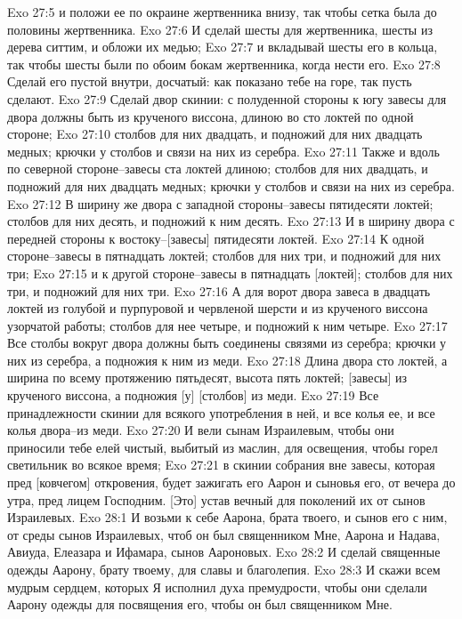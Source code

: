 Exo 27:5  и положи ее по окраине жертвенника внизу, так чтобы сетка была до половины жертвенника.
Exo 27:6  И сделай шесты для жертвенника, шесты из дерева ситтим, и обложи их медью;
Exo 27:7  и вкладывай шесты его в кольца, так чтобы шесты были по обоим бокам жертвенника, когда нести его.
Exo 27:8  Сделай его пустой внутри, досчатый: как показано тебе на горе, так пусть сделают.
Exo 27:9  Сделай двор скинии: с полуденной стороны к югу завесы для двора должны быть из крученого виссона, длиною во сто локтей по одной стороне;
Exo 27:10  столбов для них двадцать, и подножий для них двадцать медных; крючки у столбов и связи на них из серебра.
Exo 27:11  Также и вдоль по северной стороне--завесы ста локтей длиною; столбов для них двадцать, и подножий для них двадцать медных; крючки у столбов и связи на них из серебра.
Exo 27:12  В ширину же двора с западной стороны--завесы пятидесяти локтей; столбов для них десять, и подножий к ним десять.
Exo 27:13  И в ширину двора с передней стороны к востоку--[завесы] пятидесяти локтей.
Exo 27:14  К одной стороне--завесы в пятнадцать локтей; столбов для них три, и подножий для них три;
Exo 27:15  и к другой стороне--завесы в пятнадцать [локтей]; столбов для них три, и подножий для них три.
Exo 27:16  А для ворот двора завеса в двадцать локтей из голубой и пурпуровой и червленой шерсти и из крученого виссона узорчатой работы; столбов для нее четыре, и подножий к ним четыре.
Exo 27:17  Все столбы вокруг двора должны быть соединены связями из серебра; крючки у них из серебра, а подножия к ним из меди.
Exo 27:18  Длина двора сто локтей, а ширина по всему протяжению пятьдесят, высота пять локтей; [завесы] из крученого виссона, а подножия [у] [столбов] из меди.
Exo 27:19  Все принадлежности скинии для всякого употребления в ней, и все колья ее, и все колья двора--из меди.
Exo 27:20  И вели сынам Израилевым, чтобы они приносили тебе елей чистый, выбитый из маслин, для освещения, чтобы горел светильник во всякое время;
Exo 27:21  в скинии собрания вне завесы, которая пред [ковчегом] откровения, будет зажигать его Аарон и сыновья его, от вечера до утра, пред лицем Господним. [Это] устав вечный для поколений их от сынов Израилевых.
Exo 28:1  И возьми к себе Аарона, брата твоего, и сынов его с ним, от среды сынов Израилевых, чтоб он был священником Мне, Аарона и Надава, Авиуда, Елеазара и Ифамара, сынов Аароновых.
Exo 28:2  И сделай священные одежды Аарону, брату твоему, для славы и благолепия.
Exo 28:3  И скажи всем мудрым сердцем, которых Я исполнил духа премудрости, чтобы они сделали Аарону одежды для посвящения его, чтобы он был священником Мне.
